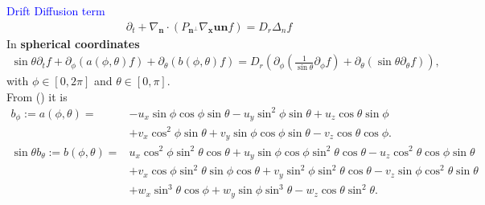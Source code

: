 \begin{frame}
	\scriptsize
	\textcolor{blue}{Drift Diffusion term}
	\begin{align*}
		\partial_t +\nabla_{\boldsymbol{n}} \cdot\left(P_{\boldsymbol{n}^{\perp}}\nabla_{\boldsymbol{x}} \boldsymbol{u} \boldsymbol{n} f\right) =D_r \Delta_n f
	\end{align*}
	\pause
	In \textbf{spherical coordinates}
	\begin{align}
		\sin \theta \partial_t f + \partial_\phi\left(a(\phi, \theta) f\right)+\partial_\theta\left(b(\phi, \theta) f\right) = D_r \left(\partial_\phi\left(\frac{1}{\sin \theta} \partial_\phi f\right)+\partial_\theta\left(\sin \theta \partial_\theta f\right)\right), \label{Smochluch_S2}
	\end{align}
	with $\phi \in [0, 2 \pi]$ and $\theta \in [0, \pi]$. \\
	\pause
	\vspace{8mm}
	From (\cite{zbMATH05037679}) it is
	\begin{align*}
		b_\phi := a(\phi, \theta) = & -u_{x} \sin \phi \cos \phi \sin \theta-u_{y} \sin ^2 \phi \sin \theta+u_{z} \cos \theta \sin \phi \\
		& +v_{x} \cos ^2 \phi \sin \theta+v_{y} \sin \phi \cos \phi \sin \theta-v_{z} \cos \theta \cos \phi.\\
		\sin \theta b_\theta := b(\phi, \theta)= & u_{x} \cos ^2 \phi \sin ^2 \theta \cos \theta+u_{y} \sin \phi \cos \phi \sin ^2 \theta \cos \theta-u_{z} \cos ^2 \theta \cos \phi \sin \theta \\
		& +v_{x} \cos \phi \sin ^2 \theta \sin \phi \cos \theta+v_{y} \sin ^2 \phi \sin ^2 \theta \cos \theta-v_{z} \sin \phi \cos ^2 \theta \sin \theta \\
		& +w_{x} \sin ^3 \theta \cos \phi+w_{y} \sin \phi \sin ^3 \theta-w_{z} \cos \theta \sin ^2 \theta.
	\end{align*}
\end{frame}

